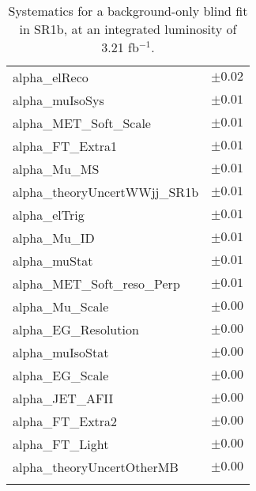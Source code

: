 \begin{table}
\begin{center}
\begin{tabular*}{\textwidth}{@{\extracolsep{\fill}}lc}
alpha\_elReco         & $\pm 0.02$       \\
alpha\_muIsoSys         & $\pm 0.01$       \\
alpha\_MET\_Soft\_Scale         & $\pm 0.01$       \\
alpha\_FT\_Extra1         & $\pm 0.01$       \\
alpha\_Mu\_MS         & $\pm 0.01$       \\
alpha\_theoryUncertWWjj\_SR1b         & $\pm 0.01$       \\
alpha\_elTrig         & $\pm 0.01$       \\
alpha\_Mu\_ID         & $\pm 0.01$       \\
alpha\_muStat         & $\pm 0.01$       \\
alpha\_MET\_Soft\_reso\_Perp         & $\pm 0.01$       \\
alpha\_Mu\_Scale         & $\pm 0.00$       \\
alpha\_EG\_Resolution         & $\pm 0.00$       \\
alpha\_muIsoStat         & $\pm 0.00$       \\
alpha\_EG\_Scale         & $\pm 0.00$       \\
alpha\_JET\_AFII         & $\pm 0.00$       \\
alpha\_FT\_Extra2         & $\pm 0.00$       \\
alpha\_FT\_Light         & $\pm 0.00$       \\
alpha\_theoryUncertOtherMB         & $\pm 0.00$       \\
\noalign{\smallskip}\hline\noalign{\smallskip}
\end{tabular*}
\end{center}
\caption{Systematics for a background-only blind fit in SR1b, at an integrated luminosity of 3.21 fb$^{-1}$.}
\label{tab:histfitter:syst:bgonly:SR1b}
\end{table}
%



